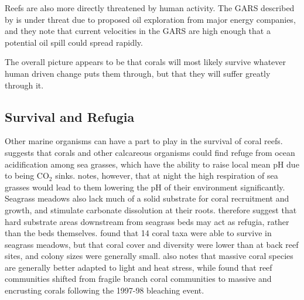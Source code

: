 \documentclass[11pt,a4paper]{article}
\begin{document}
Reefs are also more directly threatened by human activity.
 The GARS described by \cite{Francini-Filho2018} is under threat due to proposed oil exploration from major energy companies, and they note that current velocities in the GARS are high enough that a potential oil spill could spread rapidly.

The overall picture appears to be that corals will most likely survive whatever human driven change puts them through, but that they will suffer greatly through it.

\subsection{Survival and Refugia}


Other marine organisms can have a part to play in the survival of coral reefs.
 \cite{Manzello2012} suggests that corals and other calcareous organisms could find refuge from ocean acidification among sea grasses, which have the ability to raise local mean pH due to being CO$_{2}$ sinks.
 \cite{Camp2018} notes, however, that at night the high respiration of sea grasses would lead to them lowering the pH of their environment significantly.
 Seagrass meadows also lack much of a solid substrate for coral recruitment and growth, and stimulate carbonate dissolution at their roots. 
\cite{Manzello2012} therefore suggest that hard substrate areas downstream from seagrass beds may act as refugia, rather than the beds themselves.
 \cite{Lohr2017} found that 14 coral taxa were able to survive in seagrass meadows, but that coral cover and diversity were lower than at back reef sites, and colony sizes were generally small.
 \cite{Camp2018} also notes that massive coral species are generally better adapted to light and heat stress, while \cite{Loya2001} found that reef communities shifted from fragile branch coral communities to massive and encrusting corals following the 1997-98 bleaching event. 
\end{document}

